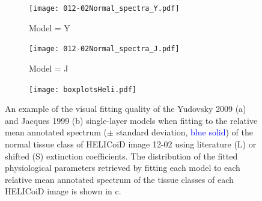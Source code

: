 \begin{figure}[h!]
    \centering
    \begin{subfigure}{0.49\textwidth}
        \texttt{[image: 012-02Normal\_spectra\_Y.pdf]}
        \caption{Model = Y}
        \label{fig:backwardsHSIHeliY}
    \end{subfigure}
    \begin{subfigure}{0.49\textwidth}
        \texttt{[image: 012-02Normal\_spectra\_J.pdf]}
        \caption{Model = J}
        \label{fig:backwardsHSIHeliJ}
    \end{subfigure}
    \begin{subfigure}{\textwidth}
        \texttt{[image: boxplotsHeli.pdf]}
        \caption{}
        \label{fig:boxplotsHeli}
    \end{subfigure}
    \caption{An example of the visual fitting quality of the Yudovsky 2009 (a) and Jacques 1999 (b) single-layer models when fitting to the relative mean annotated spectrum ($\pm$ standard deviation, \textcolor{blue}{blue solid}) of the normal tissue class of HELICoiD image 12-02 using literature (L) or shifted (S) extinction coefficients. The distribution of the fitted physiological parameters retrieved by fitting each model to each relative mean annotated spectrum of the tissue classes of each HELICoiD image is shown in c.}
    \label{fig:HELICoiDann}
\end{figure}


